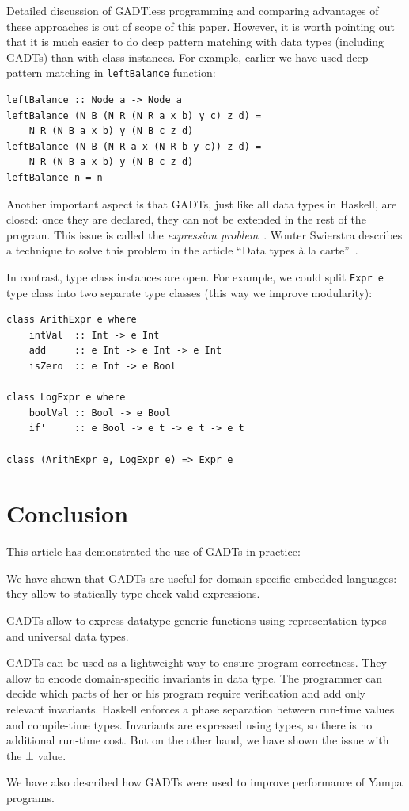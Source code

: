 \documentclass{tmr}
\newcommand{\italic}[1]{\textit{#1}}
\begin{document}
Detailed discussion of GADTless programming and comparing advantages of these approaches is out of scope of this paper. However, it is worth pointing out that it is much easier to do deep pattern matching with data types (including GADTs) than with class instances. For example, earlier we have used deep pattern matching in \verb|leftBalance| function:

\begin{Verbatim}
leftBalance :: Node a -> Node a
leftBalance (N B (N R (N R a x b) y c) z d) =
    N R (N B a x b) y (N B c z d)
leftBalance (N B (N R a x (N R b y c)) z d) =
    N R (N B a x b) y (N B c z d)
leftBalance n = n
\end{Verbatim}

Another important aspect is that GADTs, just like all data types in Haskell, are closed: once they are declared, they can not be extended in the rest of the program. This issue is called the \italic{expression problem}~\cite{expression_problem}. Wouter Swierstra describes a technique to solve this problem in the article ``Data types \`{a} la carte''~\cite{a_la_carte}.

In contrast, type class instances are open. For example, we could split \verb|Expr e| type class into two separate type classes (this way we improve modularity):

\begin{Verbatim}
class ArithExpr e where
    intVal  :: Int -> e Int
    add     :: e Int -> e Int -> e Int
    isZero  :: e Int -> e Bool

class LogExpr e where
    boolVal :: Bool -> e Bool
    if'     :: e Bool -> e t -> e t -> e t
    
class (ArithExpr e, LogExpr e) => Expr e
\end{Verbatim}

\section{Conclusion}
\label{sec:conclusion}

This article has demonstrated the use of GADTs in practice:

\begin{longitem}
\item We have shown that GADTs are useful for domain-specific embedded languages: they allow to statically type-check valid expressions.
\item GADTs allow to express datatype-generic functions using representation types and universal data types.
\item GADTs can be used as a lightweight way to ensure program correctness. They allow to encode domain-specific invariants in data type. The programmer can decide which parts of her or his program require verification and add only relevant invariants. Haskell enforces a phase separation between run-time values and compile-time types. Invariants are expressed using types, so there is no additional run-time cost. But on the other hand, we have shown the issue with the $\bot$ value.
\item We have also described how GADTs were used to improve performance of Yampa programs.
\end{longitem}
\end{document}
